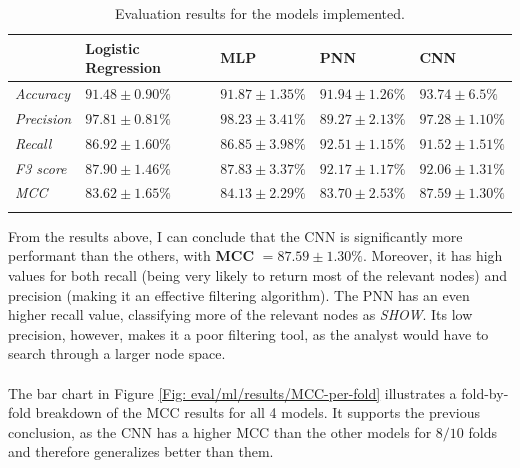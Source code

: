 		\begin{longtable}{|p{}|p{}|p{}|p{}|p{}|}
			\hline
			& \textbf{Logistic Regression} & \textbf{MLP} & \textbf{PNN} &  \textbf{CNN}\\
			\hline
			\textit{Accuracy} & $91.48 \pm 0.90 \%$ &$91.87 \pm 1.35 \%$  &  $91.94 \pm 1.26 \%$ &\cellcolor{green!50}  $\mathbf{93.74 \pm 6.5 \%}$ \\
			\hline
			\textit{Precision} & $97.81 \pm 0.81\%$& $98.23 \pm 3.41 \%$ &   $89.27 \pm 2.13 \%$ & \cellcolor{green!50} $\mathbf{97.28 \pm 1.10 \%}$  \\
			\hline
			\textit{Recall} & $86.92 \pm 1.60\%$& $86.85 \pm 3.98 \%$ & $92.51 \pm 1.15 \%$ & \cellcolor{green!50} $\mathbf{91.52 \pm 1.51 \%}$  \\
			\hline
			\textit{F3 score} & $87.90 \pm 1.46 \%$ & $87.83 \pm 3.37 \%$  &  $92.17 \pm 1.17 \%$ & \cellcolor{green!50} $\mathbf{92.06 \pm 1.31 \%}$\\
			\hline
			\textit{MCC} & $83.62 \pm 1.65\%$& $84.13 \pm 2.29 \%$ &  $83.70 \pm 2.53 \%$ & \cellcolor{green!50} $\mathbf{87.59 \pm 1.30 \%}$\\
			\hline
			\caption{Evaluation results for the models implemented.}
			\label{Table: eval/models/results/overall}
		\end{longtable}
		From the results above, I can conclude that the CNN is significantly more performant than the others, with \textbf{MCC} $\mathbf{ = 87.59 \pm 1.30 \%}$. Moreover, it has high values for both recall (being very likely to return most of the relevant nodes) and precision (making it an effective filtering algorithm). The PNN has an even higher recall value, classifying more of the relevant nodes as \textit{SHOW}. Its low precision, however, makes it a poor filtering tool, as the analyst would have to search through a larger node space.
		\\ \\
		The bar chart in Figure \ref{Fig: eval/ml/results/MCC-per-fold} illustrates a fold-by-fold breakdown of the MCC results for all 4 models. It supports the previous conclusion, as the CNN has a higher MCC than the other models for $8/10$ folds and therefore generalizes better than them.    
